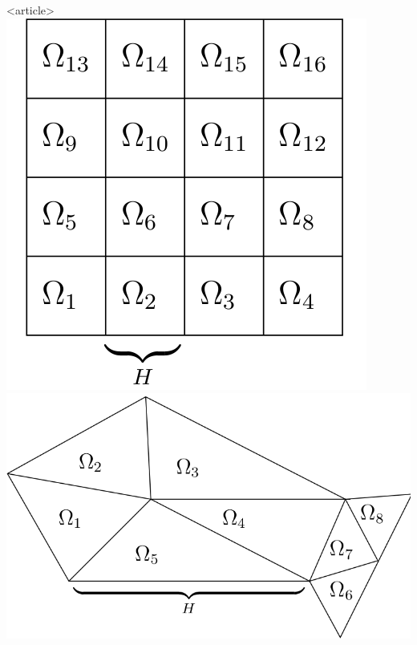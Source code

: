 \documentclass[aspectratio=169,11pt]{beamer}
\theoremstyle{definition}
\begin{document}
\begin{frame}
\begin{columns}
\begin{column}{0.4\linewidth}
      \begin{onlyenv}<article>
        \includegraphics[width=0.25\linewidth]{konstr_n_uberl_str}
        \vskip5mm
        \includegraphics[width=0.36\linewidth]{konstr_n_uberl_unstr}
      \end{onlyenv}
    \end{column}
  \end{columns}
\end{frame}
\end{document}
